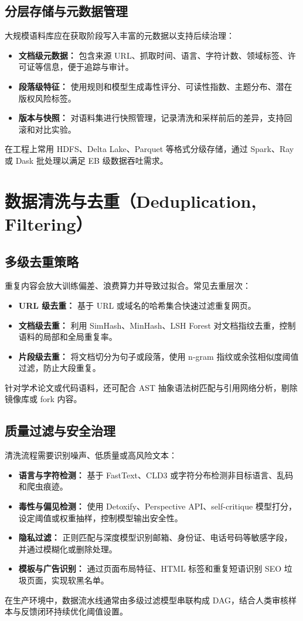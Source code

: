 \documentclass[UTF8,zihao=-4]{ctexart}
\begin{document}
\subsection{分层存储与元数据管理}
大规模语料库应在获取阶段写入丰富的元数据以支持后续治理：
\begin{itemize}
  \item \textbf{文档级元数据：} 包含来源 URL、抓取时间、语言、字符计数、领域标签、许可证等信息，便于追踪与审计。
  \item \textbf{段落级特征：} 使用规则和模型生成毒性评分、可读性指数、主题分布、潜在版权风险标签。
  \item \textbf{版本与快照：} 对语料集进行快照管理，记录清洗和采样前后的差异，支持回滚和对比实验。
\end{itemize}
在工程上常用 HDFS、Delta Lake、Parquet 等格式分级存储，通过 Spark、Ray 或 Dask 批处理以满足 EB 级数据吞吐需求。

\section{数据清洗与去重（Deduplication, Filtering）}
\subsection{多级去重策略}
重复内容会放大训练偏差、浪费算力并导致过拟合。常见去重层次：
\begin{itemize}
  \item \textbf{URL 级去重：} 基于 URL 或域名的哈希集合快速过滤重复网页。
  \item \textbf{文档级去重：} 利用 SimHash、MinHash、LSH Forest 对文档指纹去重，控制语料的局部和全局重复率。
  \item \textbf{片段级去重：} 将文档切分为句子或段落，使用 n-gram 指纹或余弦相似度阈值过滤，防止大段重复。
\end{itemize}
针对学术论文或代码语料，还可配合 AST 抽象语法树匹配与引用网络分析，剔除镜像库或 fork 内容。

\subsection{质量过滤与安全治理}
清洗流程需要识别噪声、低质量或高风险文本：
\begin{itemize}
  \item \textbf{语言与字符检测：} 基于 FastText、CLD3 或字符分布检测非目标语言、乱码和爬虫痕迹。
  \item \textbf{毒性与偏见检测：} 使用 Detoxify、Perspective API、self-critique 模型打分，设定阈值或权重抽样，控制模型输出安全性。
  \item \textbf{隐私过滤：} 正则匹配与深度模型识别邮箱、身份证、电话号码等敏感字段，并通过模糊化或删除处理。
  \item \textbf{模板与广告识别：} 通过页面布局特征、HTML 标签和重复短语识别 SEO 垃圾页面，实现软黑名单。
\end{itemize}
在生产环境中，数据流水线通常由多级过滤模型串联构成 DAG，结合人类审核样本与反馈闭环持续优化阈值设置。
\end{document}
